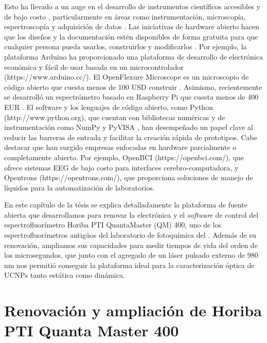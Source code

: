 Esto ha llevado a un auge en el desarrollo de instrumentos científicos accesibles y de bajo costo \cite{wenzel_open_2023, arancio_inequalities_2023}, particularmente en áreas como instrumentación, microscopía, espectroscopía y adquisición de datos \cite{jameson_fluorescent_1989, li_optical_2022, hu_fluorescent_2022}.
Las iniciativas de hardware abierto hacen que los diseños y la documentación estén disponibles de forma gratuita para que cualquier persona pueda usarlos, construirlos y modificarlos \cite{powell_democratizing_2012, oellermann_open_2022}.
Por ejemplo, la plataforma Arduino ha proporcionado una plataforma de desarrollo de electrónica económica y fácil de usar basada en un microcontrolador (https://www.arduino.cc/).
El OpenFlexure Microscope es un microscopio de código abierto que cuesta menos de 100 USD construir \cite{collins_robotic_2020}.
Asimismo, recientemente se desarrolló un espectrómetro basado en Raspberry Pi que cuesta menos de 400 EUR \cite{tunens_optical_2024}.
El software y los lenguajes de código abierto, como Python (http://www.python.org), que cuentan con bibliotecas numéricas y de instrumentación como NumPy \cite{harris_array_2020} y PyVISA \cite{grecco_pyvisa_2023}, han desempeñado un papel clave al reducir las barreras de entrada y facilitar la creación rápida de prototipos.
Cabe destacar que han surgido empresas enfocadas en hardware parcialmente o completamente abierto. Por ejemplo, OpenBCI (https://openbci.com/), que ofrece sistemas EEG de bajo costo para interfaces cerebro-computadora, y Opentrons (https://opentrons.com/), que proporciona soluciones de manejo de líquidos para la automatización de laboratorios.

En este capítulo de la tésis se explica detalladamente la plataforma de fuente abierta que desarrollamos para renovar la electrónica y el \textit{software} de control del espectrofluorímetro Horiba PTI QuantaMaster (QM) 400, uno de los espectrofluorímetros antigüos del laboratorio de fotoquímica del .
Además de su renovación, ampliamos sus capacidades para medir tiempos de vida del orden de los microsegundos, que junto con el agregado de un láser pulsado externo de 980 nm nos permitió conseguir la plataforma ideal para la caracterización óptica de UCNPs tanto estática como dinámica.

\section{Renovación y ampliación de Horiba PTI Quanta Master 400 }

